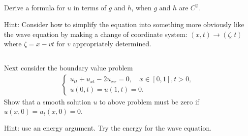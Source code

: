 \documentclass[11pt,letterpaper]{article}
\begin{document}
\subsection{}
Derive a formula for $u$ in terms of $g$ and $h$, when $g$ and $h$ are $C^2$. 

Hint: Consider how to simplify the equation into something more obviously like the wave equation
by making a change of coordinate system: $(x,t)\to (\zeta,t)$ where $\zeta = x-vt$ for $v$ appropriately determined. 

\subsection{}
Next consider the boundary value problem 
\begin{align}
    \begin{cases}
        u_{tt}+u_{xt}-2u_{xx} = 0,\quad x\in[0,1], t>0,\\
        u(0,t) = u(1,t) = 0.
    \end{cases}
\end{align}
Show that a smooth solution $u$ to above problem must be zero if $u(x,0)=u_t(x,0)=0$. 

Hint: use an energy argument. Try the energy for the wave equation. 

    
\vfill
\printbibliography
\end{document}
